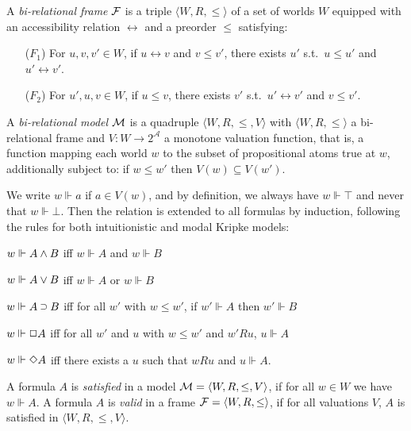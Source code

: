 \documentclass[twoside]{aiml20}
\begin{document}
\begin{definition}
	A \emph{bi-relational frame} $\mathcal{F}$ is a triple $\langle W, R, \le \rangle$ 
	of a set of worlds $W$ equipped with an {accessibility relation} $\rel$ and a preorder $\le$ satisfying:
	\begin{enumerate}
		\item[($F_1$)] For $u, v, v' \in W$, if $u \rel v$ and $v \le v'$, there exists $u'$ s.t.~$u \le u'$ and $u' \rel v'$.
		
		\item[($F_2$)] For $u', u, v \in W$, if $u \le v$, there exists $v'$ s.t.~$u' \rel v'$ and $v\le v'$.
	\end{enumerate}
\end{definition}

\begin{definition}
	A \emph{bi-relational model} $\mathcal{M}$ is a quadruple $\langle W, R,\le,V \rangle$ with $\langle W, R, \le \rangle$ a bi-relational frame and $V\colon W \to 2^\mathcal{A}$ a monotone valuation function, that is, a function mapping each world $w$ to the subset of propositional atoms true at $w$, additionally subject to:
	if $w \le w'$ then $V(w)\subseteq V(w')$.
\end{definition}

We write $w \Vdash a$ if $a \in V(w)$, and by definition, we always have $w \Vdash \top$ and never that $w \Vdash \bot$. 
%
Then the relation is extended to all formulas by induction, following the rules for both intuitionistic and modal Kripke models:

$w \Vdash A \mathbin{\wedge} B$ iff $w \Vdash A$ and $w \Vdash B$

$w \Vdash A \mathbin{\vee} B$ iff $w \Vdash A$ or $w \Vdash B$

$w \Vdash A \IMP B$ iff for all $w'$ with $w \le w'$, if $w' \Vdash A$ then $w' \Vdash B$

$w \Vdash \mathord{\Box} A$ iff for all $w'$ and $u$ with $w \le w'$ and $w'Ru$, $u \Vdash A$ %

$w \Vdash \mathord{\Diamond} A$ iff there exists a $u$ such that $wRu$ and $u \Vdash A$.

\begin{definition}
	A formula $A$ is \emph{satisfied} in a model $\mathcal{M} = \langle W, R, \le, V \rangle$, if for all $w \in W$ we have $w \Vdash A$.
	A formula $A$ is \emph{valid} in a frame $\mathcal{F} = \langle W, R, \le \rangle$, if for all valuations $V$, $A$ is satisfied in $\langle W, R, \le, V \rangle$.
\end{definition}
\end{document}

